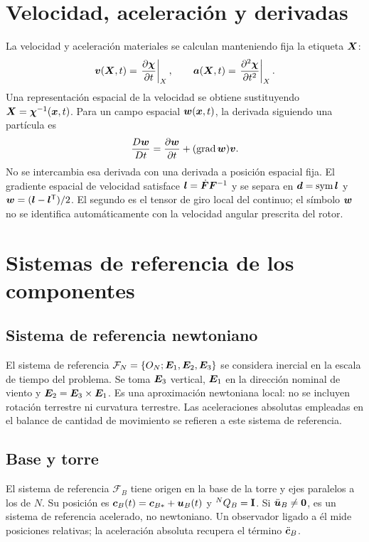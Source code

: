 \section{Velocidad, aceleración y derivadas}
La velocidad y aceleración materiales se calculan manteniendo fija la etiqueta $\bm{X}$:
\begin{equation}
 \bm{v}(\bm{X},t)=\left.\frac{\partial\bm{\chi}}{\partial t}\right|_X,
 \qquad \bm{a}(\bm{X},t)=\left.\frac{\partial^2\bm{\chi}}{\partial t^2}\right|_X.
\end{equation}
Una representación espacial de la velocidad se obtiene sustituyendo $\bm{X}=\bm{\chi}^{-1}(\bm{x},t)$. Para un campo espacial $\bm{w}(\bm{x},t)$, la derivada siguiendo una partícula es
\begin{equation}
 \frac{D\bm{w}}{Dt}=\frac{\partial\bm{w}}{\partial t}+(\operatorname{grad}\bm{w})\bm{v}.
\end{equation}
No se intercambia esa derivada con una derivada a posición espacial fija. El gradiente espacial de velocidad satisface $\boldsymbol{l}=\dot{\boldsymbol{F}}\boldsymbol{F}^{-1}$ y se separa en $\boldsymbol{d}=\operatorname{sym}\boldsymbol{l}$ y $\boldsymbol{w}=(\boldsymbol{l}-\boldsymbol{l}^\mathsf T)/2$. El segundo es el tensor de giro local del continuo; el símbolo $\boldsymbol{w}$ no se identifica automáticamente con la velocidad angular prescrita del rotor.

\section{Sistemas de referencia de los componentes}
\subsection{Sistema de referencia newtoniano}
El sistema de referencia $\mathcal F_N=\{O_N;\bm{E}_1,\bm{E}_2,\bm{E}_3\}$ se considera inercial en la escala de tiempo del problema. Se toma $\bm{E}_3$ vertical, $\bm{E}_1$ en la dirección nominal de viento y $\bm{E}_2=\bm{E}_3\times\bm{E}_1$. Es una aproximación newtoniana local: no se incluyen rotación terrestre ni curvatura terrestre. Las aceleraciones absolutas empleadas en el balance de cantidad de movimiento se refieren a este sistema de referencia.

\subsection{Base y torre}
El sistema de referencia $\mathcal F_B$ tiene origen en la base de la torre y ejes paralelos a los de $N$. Su posición es $\bm{c}_B(t)=\bm{c}_{B*}+\bm{u}_B(t)$ y ${}^NQ_B=\mathbf I$. Si $\ddot{\bm{u}}_B\ne\bm{0}$, es un sistema de referencia acelerado, no newtoniano. Un observador ligado a él mide posiciones relativas; la aceleración absoluta recupera el término $\ddot{\bm{c}}_B$.

